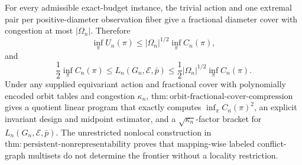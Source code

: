 For every admissible exact-budget instance, the trivial action and one extremal pair per positive-diameter observation fiber give a fractional diameter cover with congestion at most \(|\Omega_n|\).  Therefore
\[
 \inf_\pi U_n(\pi)
 \le |\Omega_n|^{1/2}\inf_\pi C_n(\pi),
\]
and
\[
 \frac12\inf_\pi C_n(\pi)
 \le L_n(G_n,\mathcal E,\bar p)
 \le \frac12|\Omega_n|^{1/2}\inf_\pi C_n(\pi).
\]
Under any supplied equivariant action and fractional cover with polynomially encoded orbit tables and congestion \(\kappa_n\), \(\mathrm{thm{:}orbit\text{-}fractional\text{-}cover\text{-}compression}\) gives a quotient linear program that exactly computes \(\inf_\pi C_n(\pi)^2\), an explicit invariant design and midpoint estimator, and a \(\sqrt{\kappa_n}\)-factor bracket for \(L_n(G_n,\mathcal E,\bar p)\).  The unrestricted nonlocal construction in \(\mathrm{thm{:}persistent\text{-}nonrepresentability}\) proves that mapping-wise labeled conflict-graph multisets do not determine the frontier without a locality restriction.